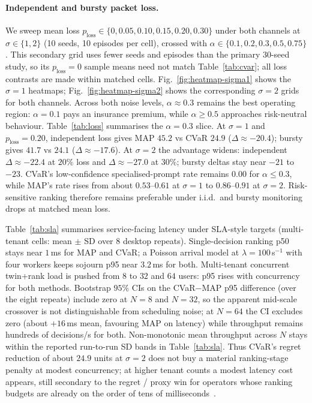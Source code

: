 \documentclass[journal]{IEEEtran}
\begin{document}
\paragraph{Independent and bursty packet loss.}
We sweep mean loss \(p_{\mathrm{loss}}\in\{0,0.05,0.10,0.15,0.20,0.30\}\) under both channels at \(\sigma\in\{1,2\}\) (10 seeds, 10 episodes per cell), crossed with \(\alpha\in\{0.1,0.2,0.3,0.5,0.75\}\).
This secondary grid uses fewer seeds and episodes than the primary 30-seed study, so its \(p_{\mathrm{loss}}=0\) sample means need not match Table~\ref{tab:cvar}; all loss contrasts are made within matched cells.
Fig.~\ref{fig:heatmap-sigma1} shows the \(\sigma=1\) heatmaps; Fig.~\ref{fig:heatmap-sigma2} shows the corresponding \(\sigma=2\) grids for both channels.
Across both noise levels, \(\alpha\approx 0.3\) remains the best operating region: \(\alpha=0.1\) pays an insurance premium, while \(\alpha\ge 0.5\) approaches risk-neutral behaviour.
Table~\ref{tab:loss} summarises the \(\alpha=0.3\) slice.
At \(\sigma=1\) and \(p_{\mathrm{loss}}=0.20\), independent loss gives MAP \(45.2\) vs CVaR \(24.9\) (\(\Delta\approx -20.4\)); bursty gives \(41.7\) vs \(24.1\) (\(\Delta\approx -17.6\)).
At \(\sigma=2\) the advantage widens: independent \(\Delta\approx -22.4\) at \(20\%\) loss and \(\Delta\approx -27.0\) at \(30\%\); bursty deltas stay near \(-21\) to \(-23\).
CVaR's low-confidence specialised-prompt rate remains \(0.00\) for \(\alpha\leq 0.3\), while MAP's rate rises from about \(0.53\)--\(0.61\) at \(\sigma=1\) to \(0.86\)--\(0.91\) at \(\sigma=2\).
Risk-sensitive ranking therefore remains preferable under i.i.d.\ and bursty monitoring drops at matched mean loss.

Table~\ref{tab:sla} summarises service-facing latency under SLA-style targets (multi-tenant cells: mean \(\pm\) SD over \(8\) desktop repeats).
Single-decision ranking p50 stays near \(1\)\,ms for MAP and CVaR; a Poisson arrival model at \(\lambda=100\)\,s\(^{-1}\) with four workers keeps sojourn p95 near \(3.2\)\,ms for both.
Multi-tenant concurrent twin+rank load is pushed from \(8\) to \(32\) and \(64\) users: p95 rises with concurrency for both methods.
Bootstrap \(95\%\) CIs on the CVaR$-$MAP p95 difference (over the eight repeats) include zero at \(N{=}8\) and \(N{=}32\), so the apparent mid-scale crossover is not distinguishable from scheduling noise; at \(N{=}64\) the CI excludes zero (about \(+16\)\,ms mean, favouring MAP on latency) while throughput remains hundreds of decisions/s for both.
Non-monotonic mean throughput across \(N\) stays within the reported run-to-run SD bands in Table~\ref{tab:sla}.
Thus CVaR's regret reduction of about \(24.9\) units at \(\sigma=2\) does not buy a material ranking-stage penalty at modest concurrency; at higher tenant counts a modest latency cost appears, still secondary to the regret / proxy win for operators whose ranking budgets are already on the order of tens of milliseconds~\cite{shi2016edge}.
\end{document}
